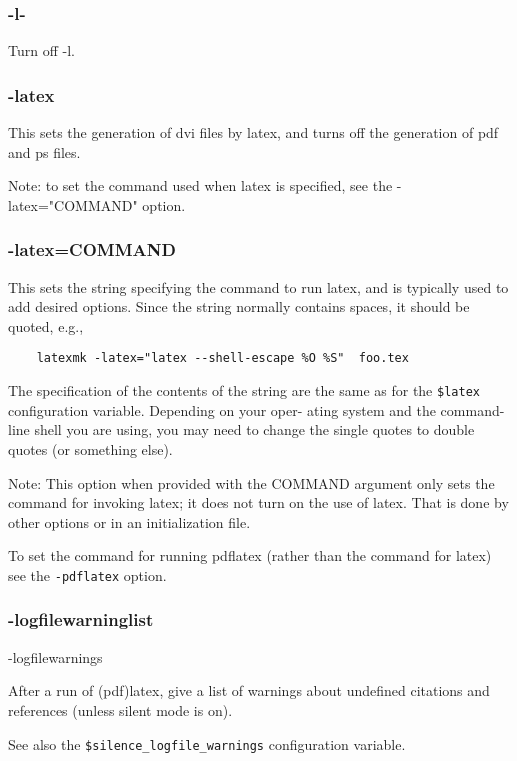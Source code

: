 \subsubsection{-l-}

Turn off -l.


\subsubsection{-latex}

This  sets  the  generation of dvi files by latex, and turns off
the generation of pdf and ps files.

Note: to set the command used when latex is specified,  see  the
-latex="COMMAND" option.


\subsubsection{-latex=COMMAND}

This sets the string specifying the command to run latex, and is typically used
to add desired options.  Since  the  string  normally contains spaces, it
should be quoted, e.g.,

\begin{verbatim}
	latexmk -latex="latex --shell-escape %O %S"  foo.tex
\end{verbatim}

The  specification of the contents of the string are the same as
for the \verb|$latex| configuration variable.  Depending on your  oper-
ating  system  and the command-line shell you are using, you may
need to change the single quotes to double quotes (or  something
else).

Note:  This  option when provided with the COMMAND argument only
sets the command for invoking latex; it does not turn on the use
of  latex. That is done by other options or in an initialization
file.

To set the command for running pdflatex (rather than the command
for latex) see the \verb|-pdflatex| option.


\subsubsection{-logfilewarninglist}
-logfilewarnings

After a run of (pdf)latex, give a list of warnings about undefined citations
and  references  (unless  silent mode is on).

See also the \verb|$silence_logfile_warnings| configuration variable.

